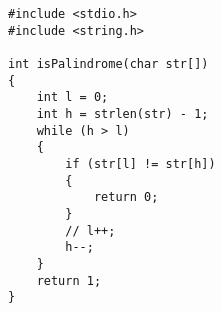 
\begin{lstlisting}[style=CStyle, caption=Mutant M4 of function isPalindrome., label=isPalindrome_m4]
#include <stdio.h> 
#include <string.h> 

int isPalindrome(char str[]) 
{ 
    int l = 0; 
    int h = strlen(str) - 1; 
    while (h > l) 
    { 
        if (str[l] != str[h]) 
        { 
            return 0;
        } 
        // l++;
        h--;
    } 
    return 1; 
} 
\end{lstlisting}